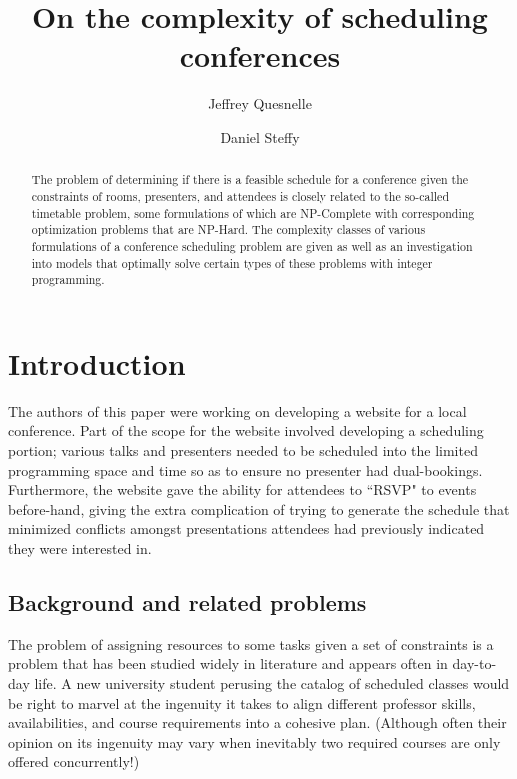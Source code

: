 \documentclass{svjour3}                     %
\begin{document}
	
\title{On the complexity of scheduling conferences}
\author{Jeffrey Quesnelle \and Daniel Steffy}
	

\maketitle
	
\begin{abstract}
	The problem of determining if there is a feasible schedule for a conference given the constraints of rooms, presenters, and attendees is closely related to the so-called timetable problem, some formulations of which are NP-Complete with corresponding optimization problems that are NP-Hard. The complexity classes of various formulations of a conference scheduling problem are given as well as an investigation into models that optimally solve certain types of these problems with integer programming.
\end{abstract}

\section{Introduction}

The authors of this paper were working on developing a website for a local conference. Part of the scope for the website involved developing a scheduling portion; various talks and presenters needed to be scheduled into the limited programming space and time so as to ensure no presenter had dual-bookings. Furthermore, the website gave the ability for attendees to ``RSVP" to events before-hand, giving the extra complication of trying to generate the schedule that minimized conflicts amongst presentations attendees had previously indicated they were interested in.

\subsection{Background and related problems}
The problem of assigning resources to some tasks given a set of constraints is a problem that has been studied widely in literature and appears often in day-to-day life. A new university student perusing the catalog of scheduled classes would be right to marvel at the ingenuity it takes to align different professor skills, availabilities, and course requirements into a cohesive plan. (Although often their opinion on its ingenuity may vary when inevitably two required courses are only offered concurrently!)  
\end{document}
